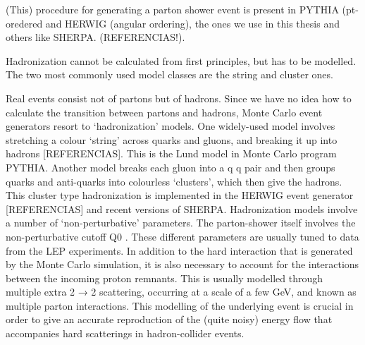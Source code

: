 (This) procedure for generating a parton shower event is present in PYTHIA (pt-oredered and HERWIG (angular ordering), the ones we use in this thesis and others like SHERPA. (REFERENCIAS!). 

Hadronization cannot be calculated from first principles, but has to be
modelled. The two most commonly used model classes are the string
and cluster ones.

Real events consist not of partons but of hadrons. Since we have no idea how to calculate the transition between partons and hadrons, Monte Carlo event generators resort to ‘hadronization’ models. One widely-used model involves stretching a colour ‘string’ across quarks and gluons, and breaking it up into hadrons [REFERENCIAS]. This is the Lund model  in Monte Carlo program PYTHIA.
Another model breaks each gluon into a q q pair and then groups quarks and anti-quarks into colourless ‘clusters’, which then give the hadrons. This cluster type hadronization is implemented in the HERWIG event generator [REFERENCIAS] and recent versions of SHERPA.
Hadronization models involve a number of ‘non-perturbative’ parameters. The parton-shower
itself involves the non-perturbative cutoff Q0 . These different parameters are usually tuned to data from
the LEP experiments.
In addition to the hard interaction that is generated by the Monte Carlo
simulation, it is also necessary to account for the interactions between the incoming proton 
remnants. This is usually modelled through multiple extra 2 → 2 scattering, occurring at a scale of a
few GeV, and known as multiple parton interactions. This modelling of the underlying event is crucial in
order to give an accurate reproduction of the (quite noisy) energy flow that accompanies hard scatterings
in hadron-collider events.




